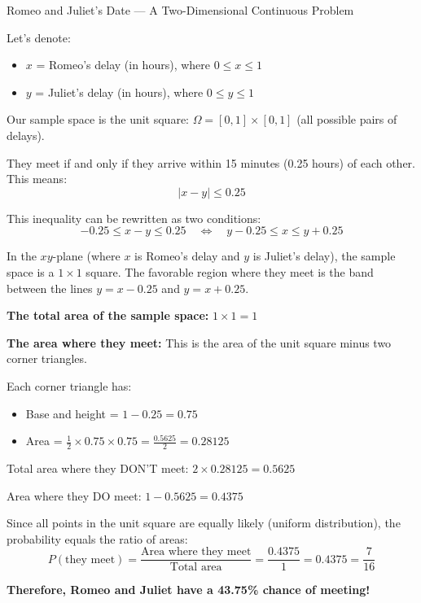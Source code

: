 \begin{itemize}
\begin{exampleboxbreak}{Romeo and Juliet's Date — A Two-Dimensional Continuous Problem}

Let's denote:
\begin{itemize}
    \item $x$ = Romeo's delay (in hours), where $0 \leq x \leq 1$
    \item $y$ = Juliet's delay (in hours), where $0 \leq y \leq 1$
\end{itemize}

Our sample space is the unit square: $\Omega = [0,1] \times [0,1]$ (all possible pairs of delays).


They meet if and only if they arrive within 15 minutes (0.25 hours) of each other. This means:
\[
|x - y| \leq 0.25
\]

This inequality can be rewritten as two conditions:
\[
-0.25 \leq x - y \leq 0.25 \quad \Longleftrightarrow \quad y - 0.25 \leq x \leq y + 0.25
\]


In the $xy$-plane (where $x$ is Romeo's delay and $y$ is Juliet's delay), the sample space is a $1 \times 1$ square. The favorable region where they meet is the band between the lines $y = x - 0.25$ and $y = x + 0.25$.

\textbf{The total area of the sample space:} $1 \times 1 = 1$

\textbf{The area where they meet:} This is the area of the unit square minus two corner triangles.

Each corner triangle has:
\begin{itemize}
    \item Base and height = $1 - 0.25 = 0.75$
    \item Area = $\frac{1}{2} \times 0.75 \times 0.75 = \frac{0.5625}{2} = 0.28125$
\end{itemize}

Total area where they DON'T meet: $2 \times 0.28125 = 0.5625$

Area where they DO meet: $1 - 0.5625 = 0.4375$


Since all points in the unit square are equally likely (uniform distribution), the probability equals the ratio of areas:
\[
P(\text{they meet}) = \frac{\text{Area where they meet}}{\text{Total area}} = \frac{0.4375}{1} = 0.4375 = \frac{7}{16}
\]

\textbf{Therefore, Romeo and Juliet have a 43.75\% chance of meeting!}


\end{exampleboxbreak}
\end{itemize}

